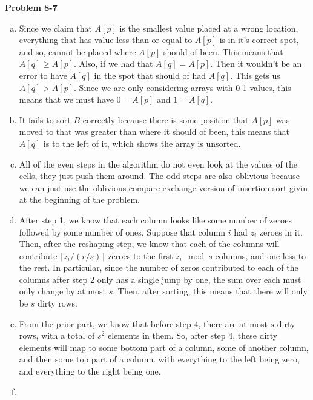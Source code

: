 \documentclass{article}
\begin{document}
\noindent\textbf{Problem 8-7}
\begin{enumerate}[a.]
\item
Since we claim that $A[p]$ is the smallest value placed at a wrong location, everything that has value less than or equal to $A[p]$ is in it's correct spot, and so, cannot be placed where $A[p]$ should of been. This means that $A[q] \ge A[p]$. Also, if we had that $A[q]=A[p]$. Then it wouldn't be an error to have $A[q]$ in the spot that should of had $A[q]$. This gets us $A[q] > A[p]$. Since we are only considering arrays with 0-1 values, this means that we must have $0=A[p]$ and $1=A[q]$.

\item

It fails to sort $B$ correctly because there is some position that $A[p]$ was moved to that was greater than where it should of been, this means that $A[q]$ is to the left of it, which shows the array is unsorted.

\item

All of the even steps in the algorithm do not even look at the values of the cells, they just push them around. The odd steps are also oblivious because we can just use the oblivious compare exchange version of insertion sort givin at the beginning of the problem.

\item

After step 1, we know that each column looks like some number of zeroes followed by some number of ones. Suppose that column $i$ had $z_i$ zeroes in it. Then, after the reshaping step, we know that each of the columns will contribute $\lceil z_i / (r/s) \rceil$ zeroes to the first $z_i \mod s$ columns, and one less to the rest. In particular, since the number of zeros contributed to each of the columns after step 2 only has a single jump by one, the sum over each must only change by at most $s$. Then, after sorting, this means that there will only be $s$ dirty rows. 

\item

From the prior part, we know that before step 4, there are at most $s$ dirty rows, with a total of $s^2$ elements in them. So, after step 4, these dirty elements will map to some bottom part of a column, some of another column, and then some top part of a column. with everything to the left being zero, and everything to the right being one.

\item


\end{enumerate}
\end{document}
